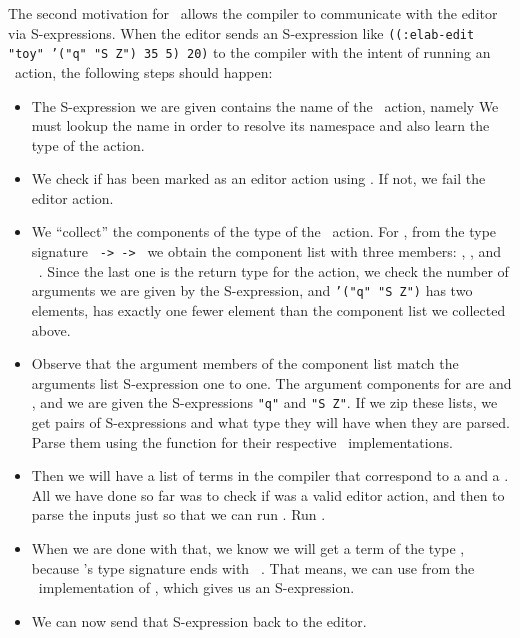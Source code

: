 The second motivation for \Editorable\ allows the compiler to communicate with
the editor via S-expressions. When the editor sends an S-expression like
\texttt{((:elab-edit "toy" '("q" "S Z") 35 5) 20)} to the
compiler with the intent of running an \Elab\ action,
the following steps should happen:
\begin{itemize}
  \item The S-expression we are given contains the name of the \Elab\ action,
    namely  We must lookup the name in order to resolve its namespace
    and also learn the type of the action.
  \item We check if  has been marked as an editor action using
    . If not, we fail the editor action.
  \item We ``collect'' the components of the type of the \Elab\ action. For
    , from the type signature \texttt{ ->  ->
     } we obtain the component list with three members: , \TT,
    and \Elab\ \TT.
    Since the last one is the return type for the action, we check the number
    of arguments we are given by the S-expression, and \texttt{'("q" "S Z")}
    has two elements, has exactly one fewer element than the component list we
    collected above.
  \item Observe that the argument members of the component list match the
    arguments list S-expression one to one. The argument components for
     are  and \TT, and we are given the S-expressions
    \texttt{"q"} and \texttt{"S Z"}. If we zip these lists, we get pairs of
    S-expressions and what type they will have when they are parsed.
    Parse them using the  function for their respective
    \Editorable\ implementations.
  \item Then we will have a list of terms in the compiler that correspond to a
     and a \TT.  All we have done so far was to check if 
    was a valid editor action, and then to parse the inputs just so that we can
    run . Run .
  \item When we are done with that, we know we will get a term of the type \TT,
    because 's type signature ends with \texttt{\Elab\ \TT}. That means,
    we can use  from the \Editorable\ implementation of \TT, which
    gives us an S-expression.
  \item We can now send that S-expression back to the editor.
\end{itemize}

